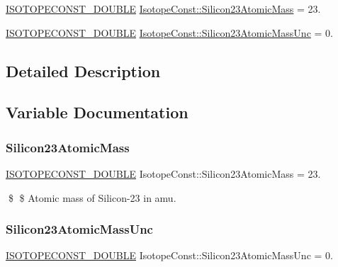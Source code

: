 \begin{DoxyCompactItemize}
\item 
\mbox{\hyperlink{group___isotope_const-_macros_ga8f45a7272ce02c0b4c65c44636ed719a}{I\+S\+O\+T\+O\+P\+E\+C\+O\+N\+S\+T\+\_\+\+D\+O\+U\+B\+LE}} \mbox{\hyperlink{group___isotope_const-_silicon-_si23_ga00a5dda06314bce6447e6aac1a603551}{Isotope\+Const\+::\+Silicon23\+Atomic\+Mass}} = 23.
\item 
\mbox{\hyperlink{group___isotope_const-_macros_ga8f45a7272ce02c0b4c65c44636ed719a}{I\+S\+O\+T\+O\+P\+E\+C\+O\+N\+S\+T\+\_\+\+D\+O\+U\+B\+LE}} \mbox{\hyperlink{group___isotope_const-_silicon-_si23_ga281229364a424ff21af07622073cb0f1}{Isotope\+Const\+::\+Silicon23\+Atomic\+Mass\+Unc}} = 0.
\end{DoxyCompactItemize}


\subsection{Detailed Description}


\subsection{Variable Documentation}
\mbox{\label{group___isotope_const-_silicon-_si23_ga00a5dda06314bce6447e6aac1a603551}} 
\subsubsection{\texorpdfstring{Silicon23\+Atomic\+Mass}{Silicon23AtomicMass}}
{\footnotesize\ttfamily \mbox{\hyperlink{group___isotope_const-_macros_ga8f45a7272ce02c0b4c65c44636ed719a}{I\+S\+O\+T\+O\+P\+E\+C\+O\+N\+S\+T\+\_\+\+D\+O\+U\+B\+LE}} Isotope\+Const\+::\+Silicon23\+Atomic\+Mass = 23.}

\$ \$ Atomic mass of Silicon-\/23 in amu. \mbox{\label{group___isotope_const-_silicon-_si23_ga281229364a424ff21af07622073cb0f1}} 
\subsubsection{\texorpdfstring{Silicon23\+Atomic\+Mass\+Unc}{Silicon23AtomicMassUnc}}
{\footnotesize\ttfamily \mbox{\hyperlink{group___isotope_const-_macros_ga8f45a7272ce02c0b4c65c44636ed719a}{I\+S\+O\+T\+O\+P\+E\+C\+O\+N\+S\+T\+\_\+\+D\+O\+U\+B\+LE}} Isotope\+Const\+::\+Silicon23\+Atomic\+Mass\+Unc = 0.}

